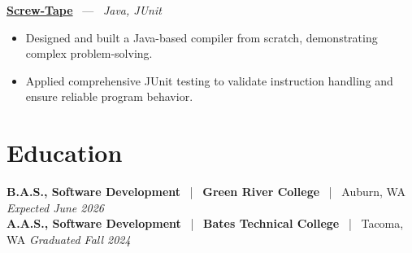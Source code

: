\documentclass[10pt, letterpaper]{article}
\newcommand{\jobhead}[4]{%
  \vspace{5pt}%
  {\bfseries\color{dark}#1}%
  ~{\color{light}|}~%
  {\bfseries\color{navy}#2}%
  ~{\color{light}|}~%
  {\color{light}#3}%
  \hfill{\color{light}\small\textit{#4}}\\[-2pt]%
}
\newcommand{\projhead}[3]{%
  \vspace{5pt}%
  {\bfseries\color{dark}\href{#2}{#1}}%
  ~{\color{light}---}~%
  {\color{light}\small\textit{#3}}\\[-2pt]%
}
\begin{document}
\projhead{Screw-Tape}{https://github.com/timmyd4/screwtape}{Java, JUnit}
\begin{itemize}
  \item Designed and built a Java-based compiler from scratch, demonstrating complex problem-solving.
  \item Applied comprehensive JUnit testing to validate instruction handling and ensure reliable program behavior.
\end{itemize}

\section{Education}

\jobhead{B.A.S., Software Development}{Green River College}{Auburn, WA}{Expected June 2026}
\jobhead{A.A.S., Software Development}{Bates Technical College}{Tacoma, WA}{Graduated Fall 2024}
\end{document}
